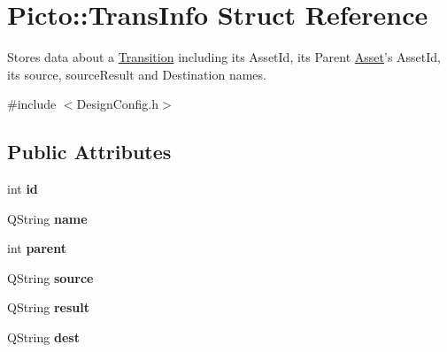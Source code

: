 \hypertarget{struct_picto_1_1_trans_info}{\section{Picto\-:\-:Trans\-Info Struct Reference}
\label{struct_picto_1_1_trans_info}
}


Stores data about a \hyperlink{class_picto_1_1_transition}{Transition} including its Asset\-Id, its Parent \hyperlink{class_picto_1_1_asset}{Asset}'s Asset\-Id, its source, source\-Result and Destination names.  




{\ttfamily \#include $<$Design\-Config.\-h$>$}

\subsection*{Public Attributes}
\begin{DoxyCompactItemize}
\item 
\hypertarget{struct_picto_1_1_trans_info_a63d17fe47e790c442dca02f23296ea8a}{int {\bfseries id}}\label{struct_picto_1_1_trans_info_a63d17fe47e790c442dca02f23296ea8a}

\item 
\hypertarget{struct_picto_1_1_trans_info_aae11be96144bbb8969d2b5db86fce632}{Q\-String {\bfseries name}}\label{struct_picto_1_1_trans_info_aae11be96144bbb8969d2b5db86fce632}

\item 
\hypertarget{struct_picto_1_1_trans_info_a9dd0b714b8b6e701b63efbc3cdc86a00}{int {\bfseries parent}}\label{struct_picto_1_1_trans_info_a9dd0b714b8b6e701b63efbc3cdc86a00}

\item 
\hypertarget{struct_picto_1_1_trans_info_a5016da1d1ce162ad48107bd883d842a2}{Q\-String {\bfseries source}}\label{struct_picto_1_1_trans_info_a5016da1d1ce162ad48107bd883d842a2}

\item 
\hypertarget{struct_picto_1_1_trans_info_abf9f3d2062f28bf7d4ed2a07958d7b15}{Q\-String {\bfseries result}}\label{struct_picto_1_1_trans_info_abf9f3d2062f28bf7d4ed2a07958d7b15}

\item 
\hypertarget{struct_picto_1_1_trans_info_a27c6b6c636f9cd649e10b21d6d623732}{Q\-String {\bfseries dest}}\label{struct_picto_1_1_trans_info_a27c6b6c636f9cd649e10b21d6d623732}

\end{DoxyCompactItemize}


